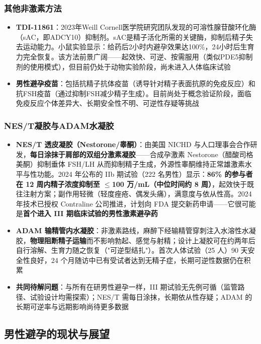 \documentclass[12pt,a4paper,twoside]{ctexbook}
\begin{document}
\subsubsection{其他非激素方法}

\begin{itemize}[leftmargin=2cm]
	\item \textbf{TDI-11861}：2023年Weill Cornell医学院研究团队发现的可溶性腺苷酸环化酶（sAC，即ADCY10）抑制剂。sAC是精子活化所需的关键酶，抑制后精子失去运动能力。小鼠实验显示：给药后2小时内避孕效果达100\%，24小时后生育力完全恢复。该方法前景广阔——起效快、可逆、按需服用（类似PDE5抑制剂的使用模式），但目前仍处于动物实验阶段，尚未进入人体临床试验
	\item \textbf{男性避孕疫苗}：包括抗精子抗体疫苗（诱导针对精子表面抗原的免疫反应）和抗FSH疫苗（通过抑制FSH减少精子生成）。目前尚处于概念验证阶段，面临免疫反应个体差异大、长期安全性不明、可逆性存疑等挑战
\end{itemize}

\subsubsection{NES/T凝胶与ADAM水凝胶}

\begin{itemize}[leftmargin=2cm]
	\item \textbf{NES/T 透皮凝胶（Nestorone/睾酮）}：由美国 NICHD 与人口理事会合作研发，\textbf{每日涂抹于肩部的双组分激素凝胶}——合成孕激素 Nestorone（醋酸司格美酮）抑制垂体 FSH/LH 从而抑制精子生成，外源性睾酮维持正常雄激素水平与性功能。2024 年公布的 IIb 期试验（222 名男性）显示：\textbf{86\% 的参与者在 12 周内精子浓度抑制至 $\leq$100 万/mL（中位时间约 8 周）}，起效快于既往注射方案；副作用轻微（轻度痤疮、偶发头痛），满意度与依从性高。2024 年技术已授权 Contraline 公司推进，计划向 FDA 提交新药申请——它很可能是\textbf{首个进入 III 期临床试验的男性激素避孕药}
	\item \textbf{ADAM 输精管内水凝胶}：非激素路线，麻醉下经输精管穿刺注入水溶性水凝胶，\textbf{物理阻断精子运输}而不影响勃起、感觉与射精；设计上凝胶可在约两年后自行溶解、生育力随之恢复（"可逆型结扎"）。首次人体试验（25 人）90 天安全性良好，24 个月随访中已有受试者达到无精子症，长期可逆性数据仍在积累
	\item \textbf{共同待解问题}：与所有在研男性避孕一样，III 期试验无先例可循（监管路径、试验设计均需探索）；NES/T 需每日涂抹，长期依从性存疑；ADAM 的长期可逆率与远期影响尚待更多数据
\end{itemize}

\subsection{男性避孕的现状与展望}
\end{document}
